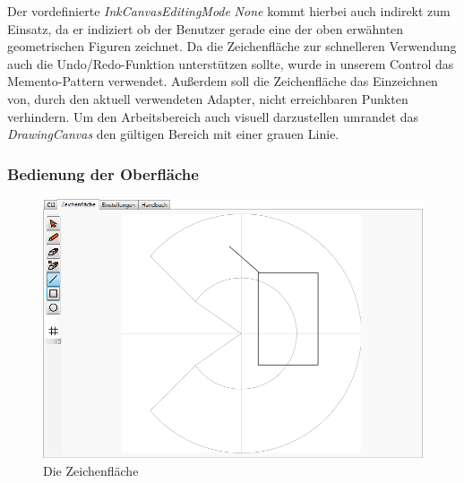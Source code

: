 Der vordefinierte \textit{InkCanvasEditingMode} \textit{None} kommt hierbei auch indirekt zum Einsatz, da er indiziert ob der Benutzer gerade eine der oben erwähnten geometrischen Figuren zeichnet. 
Da die Zeichenfläche zur schnelleren Verwendung auch die Undo/Redo-Funktion unterstützen sollte, wurde in unserem Control das Memento-Pattern verwendet. Außerdem soll die Zeichenfläche das Einzeichnen von, durch den aktuell verwendeten Adapter, nicht erreichbaren Punkten verhindern. Um den Arbeitsbereich auch visuell darzustellen umrandet das \textit{DrawingCanvas} den gültigen Bereich mit einer grauen Linie.

\subsubsection{Bedienung der Oberfläche}

\begin{figure}[H]
  \centering
  \begin{minipage}[t]{12 cm}
  	\centering
  	\includegraphics[width=12cm]{images/DrawingArea} 
    \caption{Die Zeichenfläche}
  \end{minipage}
\end{figure}

